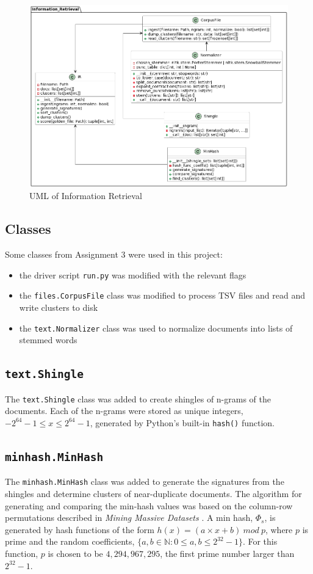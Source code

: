 \documentclass[11pt]{article}
\begin{document}
\begin{figure}[!ht]
  \includegraphics[scale=0.45]{statics/uml.png}
  \centering
  \caption{UML of Information Retrieval}
\end{figure}

\subsection{Classes}
Some classes from Assignment 3 were used in this project:
\begin{itemize}
  \item the driver script \texttt{run.py} was modified with the relevant flags
  \item the \texttt{files.CorpusFile} class was modified to process TSV files and read and write clusters to disk
  \item the \texttt{text.Normalizer} class was used to normalize documents into lists of stemmed words
\end{itemize}

\subsection{\texttt{text.Shingle}}
The \texttt{text.Shingle} class was added to create shingles of n-grams of the documents. Each of the n-grams were stored as unique integers, $-2^{64}-1 \le x \le 2^{64}-1$, generated by Python's built-in \texttt{hash()} function.

\subsection{\texttt{minhash.MinHash}}
The \texttt{minhash.MinHash} class was added to generate the signatures from the shingles and determine clusters of near-duplicate documents. The algorithm for generating and comparing the min-hash values was based on the column-row permutations described in \textit{Mining Massive Datasets} \cite{leskovec_rajaraman_ullman_2022}. A min hash, $\Phi_s$, is generated by hash functions of the form $h(x)=(a \times x + b) \ mod \ p$, where $p$ is prime and the random coefficients, $\{a,b \in \mathbb{N}: 0 \le a,b \le 2^{32}-1\}$. For this function, $p$ is chosen to be $4,294,967,295$, the first prime number larger than $2^{32}-1$.
\end{document}
